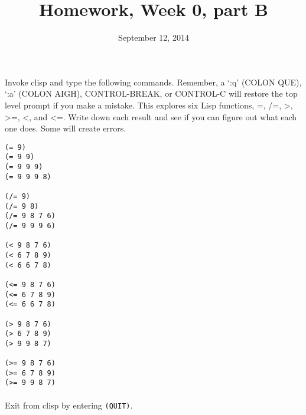 \documentclass{article}
\title{Homework, Week 0, part B}
\date{September 12, 2014}
\begin{document}
\maketitle{}
\lstset{language=Lisp}

\paragraph{}Invoke clisp and type the following commands. Remember, a `:q' (COLON QUE), `:a' (COLON AIGH), CONTROL-BREAK, or CONTROL-C will restore the top level prompt if you make a mistake. This explores six Lisp functions, =, /=, \textgreater, \textgreater=, \textless, and \textless=. Write down each result and see if you can figure out what each one does. Some will create errors.\\

\begin{multicols}{2}
\begin{lstlisting}
(= 9)
(= 9 9)
(= 9 9 9)
(= 9 9 9 8)

(/= 9)
(/= 9 8)
(/= 9 8 7 6)
(/= 9 9 9 6)

(< 9 8 7 6)
(< 6 7 8 9)
(< 6 6 7 8)

(<= 9 8 7 6)
(<= 6 7 8 9)
(<= 6 6 7 8)

(> 9 8 7 6)
(> 6 7 8 9)
(> 9 9 8 7)

(>= 9 8 7 6)
(>= 6 7 8 9)
(>= 9 9 8 7)
\end{lstlisting}
\end{multicols}

\paragraph{} Exit from clisp by entering \texttt{(QUIT)}.
\end{document}
